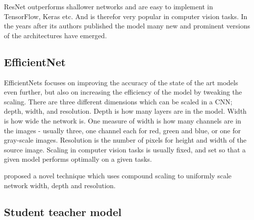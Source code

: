 \documentclass[thesis.tex]{subfiles}
\begin{document}

ResNet outperforms shallower networks and are easy to implement in TensorFlow, Keras etc. And is therefor very popular in computer vision tasks. In the years after its authors published the model many new and prominent versions of the architectures have emerged.




\subsection{EfficientNet}
EfficientNets \cite{EfficientNetRethinking19} focuses on improving the accuracy of the state of the art models even further, but also on increasing the efficiency of the model by tweaking the scaling. There are three different dimensions which can be scaled in a CNN; depth, width, and resolution. Depth is how many layers are in the model. Width is how wide the network is. One measure of width is how many channels are in the images - usually three, one  channel each for red, green and blue, or one for gray-scale images. Resolution is the number of pixels for height and width of the source image. Scaling in computer vision tasks is usually fixed, and set so that a given model performs optimally on a given tasks. 



\citeauthor*{EfficientNetRethinking19} proposed a novel technique which uses compound scaling to uniformly scale network width, depth and resolution.




\subsection{Student teacher model}
\end{document}
